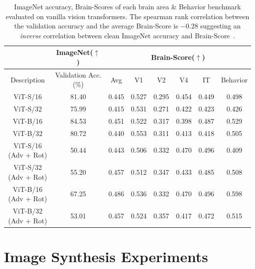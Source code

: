\documentclass{article} %
\newcommand{\record}{\textcolor{BlueModel2}}
\begin{document}
\begin{table}[h!]
\footnotesize
\centering
\begin{threeparttable}
\begin{tabular}{|c|c|c|c|c|c|c|c|} 
\hline
\multicolumn{1}{|c|}{} & ImageNet($\uparrow$) & \multicolumn{6}{|c|}{Brain-Score($\uparrow$)} \\
 \hline
 Description & Validation Acc. (\%) & Avg & V1 & V2 & V4 & IT & Behavior \\
 \hline
ViT-S/16 & 81.40 & 0.445 & 0.527 & 0.295 & 0.454 & 0.449 & 0.498\\
ViT-S/32 & 75.99 & 0.415 & 0.531 & 0.271 & 0.422 & 0.423 & 0.426\\
ViT-B/16 & 84.53 & 0.451 & 0.522 & 0.317 & 0.398 & 0.487 & 0.529\\ 
ViT-B/32 & 80.72 & 0.440 & 0.553 & 0.311 & 0.413 & 0.418 & 0.505\\ 
ViT-S/16 (Adv + Rot) & 50.44 & 0.443 & 0.506 & 0.332 & 0.470 & 0.496 & 0.409\\
ViT-S/32 (Adv + Rot) & 55.20 & 0.457 & 0.512 & 0.347 & 0.433 & 0.485 & 0.508\\
ViT-B/16 (Adv + Rot) & 67.25 & 0.486 & 0.536 & 0.332 & 0.470 & 0.496 & 0.598\\ 
ViT-B/32 (Adv + Rot) & 53.01 & 0.457 & 0.524 & 0.357 & 0.417 & 0.472 & 0.515\\ 



\hline
\end{tabular}
\end{threeparttable}
\vspace{4pt}
\caption{ImageNet accuracy, Brain-Scores of each brain area \& Behavior benchmark evaluated on vanilla vision transformers. The spearman rank correlation between the validation accuracy and the average Brain-Score is $-0.28$ suggesting an \textit{inverse} correlation between clean ImageNet accuracy and Brain-Score~\citep{schrimpf2020brain}.}
\label{table:vanilla-transformer-table}
\end{table}




\section{Image Synthesis Experiments}
\end{document}
